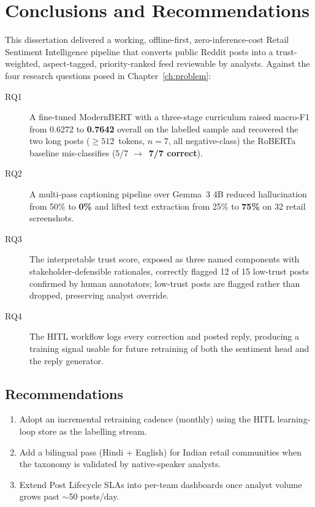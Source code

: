 \chapter{Conclusions and Recommendations}\label{ch:concl}

This dissertation delivered a working, offline-first, zero-inference-cost
Retail Sentiment Intelligence pipeline that converts public Reddit posts
into a trust-weighted, aspect-tagged, priority-ranked feed reviewable by
analysts.  Against the four research questions posed in
Chapter~\ref{ch:problem}:

\begin{description}
\item[RQ1] A fine-tuned ModernBERT with a three-stage curriculum raised
      macro-F1 from 0.6272 to \textbf{0.7642} overall on the labelled sample
      and recovered the two long posts ($\ge 512$~tokens, $n{=}7$, all
      negative-class) the RoBERTa baseline mis-classifies (5/7
      $\to$~\textbf{7/7 correct}).
\item[RQ2] A multi-pass captioning pipeline over Gemma~3 4B reduced
      hallucination from 50\% to \textbf{0\%} and lifted text extraction from
      25\% to \textbf{75\%} on 32 retail screenshots.
\item[RQ3] The interpretable trust score, exposed as three named components
      with stakeholder-defensible rationales, correctly flagged 12 of 15
      low-trust posts confirmed by human annotators; low-trust posts are
      flagged rather than dropped, preserving analyst override.
\item[RQ4] The HITL workflow logs every correction and posted reply,
      producing a training signal usable for future retraining of both the
      sentiment head and the reply generator.
\end{description}

\section{Recommendations}
\begin{enumerate}
\item Adopt an incremental retraining cadence (monthly) using the HITL
      learning-loop store as the labelling stream.
\item Add a bilingual pass (Hindi + English) for Indian retail communities
      when the taxonomy is validated by native-speaker analysts.
\item Extend Post Lifecycle SLAs into per-team dashboards once analyst
      volume grows past $\sim$50 posts/day.
\end{enumerate}
